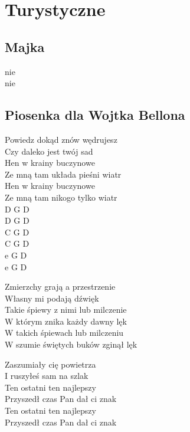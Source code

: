 \documentclass{report}
\begin{document}
\chapter*{Turystyczne}
\section*{Majka}
\begin{paracol}{2}
nie\\

\switchcolumn
nie\\

\end{paracol}
\newpage
\section*{Piosenka dla Wojtka Bellona}
\begin{paracol}{2}
Powiedz dokąd znów wędrujesz\\
Czy daleko jest twój sad\\
Hen w krainy buczynowe\\
Ze mną tam układa pieśni wiatr\\
Hen w krainy buczynowe\\
Ze mną tam nikogo tylko wiatr\\

\switchcolumn
D G D\\
D G D\\
C G D\\
C G D\\
e G D\\
e G D\\

\end{paracol}
\begin{paracol}{2}
Zmierzchy grają a przestrzenie\\
Własny mi podają dźwięk\\
Takie śpiewy z nimi lub milczenie\\
W którym znika każdy dawny lęk\\
W takich śpiewach lub milczeniu\\
W szumie świętych buków zginął lęk\\

\switchcolumn

\end{paracol}
\begin{paracol}{2}
Zaszumiały cię powietrza\\
I ruszyłeś sam na szlak\\
Ten ostatni ten najlepszy\\
Przyszedł czas Pan dał ci znak\\
Ten ostatni ten najlepszy\\
Przyszedł czas Pan dał ci znak\\

\switchcolumn

\end{paracol}
\newpage
\end{document}
